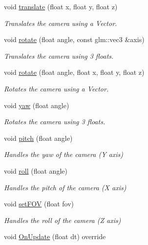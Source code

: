 \begin{DoxyCompactItemize}
void \mbox{\hyperlink{class_camera_ac9e53556c53beee69c77a97e2a1c1068}{translate}} (float x, float y, float z)
\begin{DoxyCompactList}\small\item\em Translates the camera using a Vector. \end{DoxyCompactList}\item 
void \mbox{\hyperlink{class_camera_a0e6180b5a8da63a999db3de1802c8f4c}{rotate}} (float angle, const glm\+::vec3 \&axis)
\begin{DoxyCompactList}\small\item\em Translates the camera using 3 floats. \end{DoxyCompactList}\item 
void \mbox{\hyperlink{class_camera_a4a45040f06f24a53af7f17bbcc610f22}{rotate}} (float angle, float x, float y, float z)
\begin{DoxyCompactList}\small\item\em Rotates the camera using a Vector. \end{DoxyCompactList}\item 
void \mbox{\hyperlink{class_camera_ab4eab94754431725c572d528a07a35cc}{yaw}} (float angle)
\begin{DoxyCompactList}\small\item\em Rotates the camera using 3 floats. \end{DoxyCompactList}\item 
void \mbox{\hyperlink{class_camera_a49e00b90b94853e4485a6bdf063796de}{pitch}} (float angle)
\begin{DoxyCompactList}\small\item\em Handles the yaw of the camera (Y axis) \end{DoxyCompactList}\item 
void \mbox{\hyperlink{class_camera_a72be99f88b1cc21122178109d3441818}{roll}} (float angle)
\begin{DoxyCompactList}\small\item\em Handles the pitch of the camera (X axis) \end{DoxyCompactList}\item 
void \mbox{\hyperlink{class_camera_ade53ee61895c2143da3cec03d08ef3eb}{set\+F\+OV}} (float fov)
\begin{DoxyCompactList}\small\item\em Handles the roll of the camera (Z axis) \end{DoxyCompactList}\item 
void \mbox{\hyperlink{class_camera_a39a34df15a2791296a668537a242b9e5}{On\+Update}} (float dt) override

\end{DoxyCompactItemize}
